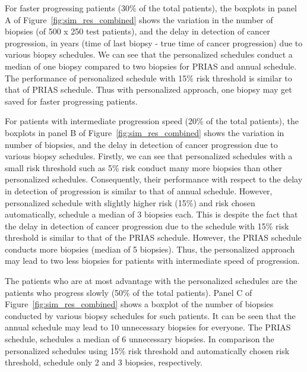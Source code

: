 For faster progressing patients (30\% of the total patients), the boxplots in panel A of Figure~\ref{fig:sim_res_combined} shows the variation in the number of biopsies (of 500 x 250 test patients), and the delay in detection of cancer progression, in years (time of last biopsy - true time of cancer progression) due to various biopsy schedules. We can see that the personalized schedules conduct a median of one biopsy compared to two biopsies for PRIAS and annual schedule. The performance of personalized schedule with 15\% risk threshold is similar to that of PRIAS schedule. Thus with personalized approach, one biopsy may get saved for faster progressing patients.

For patients with intermediate progression speed (20\% of the total patients), the boxplots in panel B of Figure~\ref{fig:sim_res_combined} shows the variation in number of biopsies, and the delay in detection of cancer progression due to various biopsy schedules. Firstly, we can see that personalized schedules with a small risk threshold such as 5\% risk conduct many more biopsies than other personalized schedules. Consequently, their performance with respect to the delay in detection of progression is similar to that of annual schedule. However, personalized schedule with slightly higher risk (15\%) and risk chosen automatically, schedule a median of 3 biopsies each. This is despite the fact that the delay in detection of cancer progression due to the schedule with 15\% risk threshold is similar to that of the PRIAS schedule. However, the PRIAS schedule conducts more biopsies (median of 5 biopsies). Thus, the personalized approach may lead to two less biopsies for patients with intermediate speed of progression.

The patients who are at most advantage with the personalized schedules are the patients who progress slowly (50\% of the total patients). Panel C of Figure~\ref{fig:sim_res_combined} shows a boxplot of the number of biopsies conducted by various biopsy schedules for such patients. It can be seen that the annual schedule may lead to 10 unnecessary biopsies for everyone. The PRIAS schedule, schedules a median of 6 unnecessary biopsies. In comparison the personalized schedules using 15\% risk threshold and automatically chosen risk threshold, schedule only 2 and 3 biopsies, respectively.
